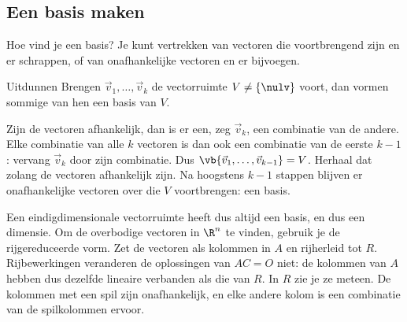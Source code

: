 \subsection{Een basis maken}

Hoe vind je een basis? Je kunt vertrekken van vectoren die voortbrengend zijn en er schrappen, of van onafhankelijke vectoren en er bijvoegen.

\begin{theorie}
\begin{stelling}{Uitdunnen}
Brengen $\vec v_1, \ldots, \vec v_k$ de vectorruimte $V \neq \{\nulv\}$ voort, dan vormen sommige van hen een basis van $V$.
\end{stelling}

\begin{bewijs}
Zijn de vectoren afhankelijk, dan is er een, zeg $\vec v_k$, een combinatie van de andere. Elke combinatie van alle $k$ vectoren is dan ook een combinatie van de eerste $k - 1$: vervang $\vec v_k$ door zijn combinatie. Dus $\vb{\vec v_1, \ldots, \vec v_{k-1}} = V$. Herhaal dat zolang de vectoren afhankelijk zijn. Na hoogstens $k - 1$ stappen blijven er onafhankelijke vectoren over die $V$ voortbrengen: een basis.
\end{bewijs}
\end{theorie}

Een eindigdimensionale vectorruimte heeft dus altijd een basis, en dus een dimensie. Om de overbodige vectoren in $\R^n$ te vinden, gebruik je de rijgereduceerde vorm. Zet de vectoren als kolommen in $A$ en rijherleid tot $R$. Rijbewerkingen veranderen de oplossingen van $AC = O$ niet: de kolommen van $A$ hebben dus dezelfde lineaire verbanden als die van $R$. In $R$ zie je ze meteen. De kolommen met een spil zijn onafhankelijk, en elke andere kolom is een combinatie van de spilkolommen ervoor.


